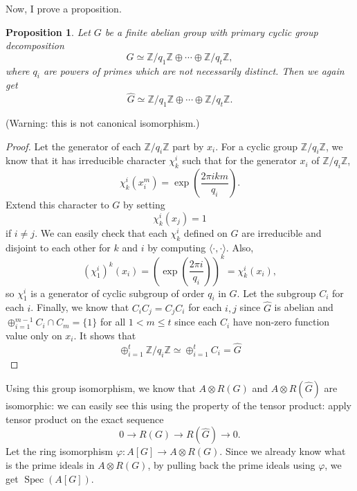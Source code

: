 \documentclass[a4paper, 12pt]{article}
\theoremstyle{Mydefinition}
\theoremstyle{Mytheorem}
\newtheorem{proposition}[statement]{Proposition}
\DeclareMathOperator{\Spec}{Spec}
\begin{document}
Now, I prove a proposition.
\begin{proposition}
Let $G$ be a finite abelian group with primary cyclic group decomposition
\begin{equation}
    G\simeq \mathbb{Z}/q_1\mathbb{Z}\oplus \cdots \oplus \mathbb{Z}/q_t\mathbb{Z},
\end{equation}
where $q_i$ are powers of primes which are not necessarily distinct. Then we again get
\begin{equation}
    \hat{G}\simeq \mathbb{Z}/q_1\mathbb{Z}\oplus \cdots \oplus \mathbb{Z}/q_t\mathbb{Z}.
\end{equation}
\end{proposition}
(Warning: this is not canonical isomorphism.)
\begin{proof}
Let the generator of each $\mathbb{Z}/q_i\mathbb{Z}$ part by $x_i$. For a cyclic group $\mathbb{Z}/q_i\mathbb{Z}$, we know that it has irreducible character $\chi^i_k$ such that for the generator $x_i$ of $\mathbb{Z}/q_i\mathbb{Z}$,
\begin{equation}
    \chi^i_k(x_i^m) = \exp(\frac{2\pi i km}{q_i}).
\end{equation}
Extend this character to $G$ by setting
\begin{equation}
    \chi_k^i(x_j) = 1
\end{equation}
if $i\neq j$. We can easily check that each $\chi_k^i$ defined on $G$ are irreducible and disjoint to each other for $k$ and $i$ by computing $\langle \cdot, \cdot \rangle$. Also,
\begin{equation}
    (\chi_1^i)^{k}(x_i) = \left(\exp(\frac{2\pi i}{q_i})\right)^{k} = \chi_k^i(x_i),
\end{equation}
so $\chi_1^i$ is a generator of cyclic subgroup of order $q_i$ in $G$. Let the subgroup $C_i$ for each $i$. Finally, we know that $C_iC_j = C_jC_i$ for each $i,j$ since $\hat{G}$ is abelian and $\oplus_{i=1}^{m-1} C_i\cap C_m = \{1\}$ for all $1<m\leq t$ since each $C_i$ have non-zero function value only on $x_i$. It shows that 
\begin{equation}
    \oplus_{i=1}^t \mathbb{Z}/q_i\mathbb{Z} \simeq \oplus_{i=1}^t C_i = \hat{G}
\end{equation}
\end{proof}

Using this group isomorphism, we know that $A\otimes R(G)$ and $A\otimes R(\hat{G})$ are isomorphic: we can easily see this using the property of the tensor product: apply tensor product on the exact sequence
\begin{equation}
    0\rightarrow R(G)\rightarrow R(\hat{G})\rightarrow 0.
\end{equation}
Let the ring isomorphism $\varphi:A[G]\rightarrow A\otimes R(G)$. Since we already know what is the prime ideals in $A\otimes R(G)$, by pulling back the prime ideals using $\varphi$, we get $\Spec(A[G])$.\\
\end{document}
